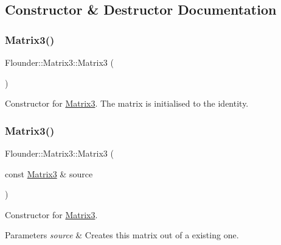 \subsection{Constructor \& Destructor Documentation}
\mbox{\label{class_flounder_1_1_matrix3_a45f191f16267632ec7595af5643d6717}} 
\subsubsection{\texorpdfstring{Matrix3()}{Matrix3()}\hspace{0.1cm}{\footnotesize\ttfamily [1/3]}}
{\footnotesize\ttfamily Flounder\+::\+Matrix3\+::\+Matrix3 (\begin{DoxyParamCaption}{ }\end{DoxyParamCaption})}



Constructor for \hyperlink{class_flounder_1_1_matrix3}{Matrix3}. The matrix is initialised to the identity. 

\mbox{\label{class_flounder_1_1_matrix3_a72297b2c1559f883cb4839479fd76b26}} 
\subsubsection{\texorpdfstring{Matrix3()}{Matrix3()}\hspace{0.1cm}{\footnotesize\ttfamily [2/3]}}
{\footnotesize\ttfamily Flounder\+::\+Matrix3\+::\+Matrix3 (\begin{DoxyParamCaption}\item[{const \hyperlink{class_flounder_1_1_matrix3}{Matrix3} \&}]{source }\end{DoxyParamCaption})}



Constructor for \hyperlink{class_flounder_1_1_matrix3}{Matrix3}. 


\begin{DoxyParams}{Parameters}
{\em source} & Creates this matrix out of a existing one. \\
\hline
\end{DoxyParams}
\mbox{\label{class_flounder_1_1_matrix3_ad6cfcaeda99aa028ea5f81fe7c6bcbc2}} 
